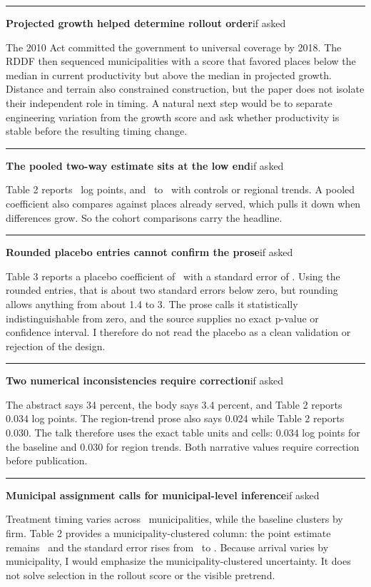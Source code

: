 \documentclass[11pt]{article}
\newcommand{\scriptframe}[3]{%
  \Needspace{11\baselineskip}%
  \par\medskip\noindent\textcolor{ScriptBlue}{\rule{\linewidth}{0.55pt}}%
  \par\smallskip\noindent
  \textbf{#1}\hfill\textcolor{ScriptGray}{\small #2}\par\smallskip
  #3\par}
\begin{document}
\scriptframe{Projected growth helped determine rollout order}{if asked}{%
  The 2010 Act committed the government to universal coverage by 2018. The RDDF
  then sequenced municipalities with a score that favored places below the
  median in current productivity but above the median in projected growth.
  Distance and terrain also constrained construction, but the paper does not
  isolate their independent role in timing. A natural next step would be to
  separate engineering variation from the growth score and ask whether
  productivity is stable before the resulting timing change.
}

\scriptframe{The pooled two-way estimate sits at the low end}{if asked}{%
  Table 2 reports \ResBaseline\ log points, and \ResTrends\ to \ResControls\
  with controls or regional trends. A pooled coefficient also compares against
  places already served, which pulls it down when differences grow. So the
  cohort comparisons carry the headline.
}

\scriptframe{Rounded placebo entries cannot confirm the prose}{if asked}{%
  Table 3 reports a placebo coefficient of \ResPlacebo\ with a standard error
  of \ResPlaceboSE. Using the rounded entries, that is about two standard
  errors below zero, but rounding allows anything from about 1.4 to 3. The
  prose calls it statistically indistinguishable from zero, and the source
  supplies no exact p-value or confidence interval. I therefore do not read the placebo as a clean
  validation or rejection of the design.
}

\scriptframe{Two numerical inconsistencies require correction}{if asked}{%
  The abstract says 34 percent, the body says 3.4 percent, and Table 2 reports
  0.034 log points. The region-trend prose also says 0.024 while Table 2 reports
  0.030. The talk therefore uses the exact table units and cells: 0.034 log
  points for the baseline and 0.030 for region trends. Both narrative values
  require correction before publication.
}

\scriptframe{Municipal assignment calls for municipal-level inference}{if asked}{%
  Treatment timing varies across \ResMunicipalities\ municipalities, while the
  baseline clusters by firm. Table 2 provides a municipality-clustered column:
  the point estimate remains \ResMunicipalCluster\ and the standard error rises
  from \ResBaselineSE\ to \ResMunicipalClusterSE. Because arrival varies by
  municipality, I would emphasize the municipality-clustered uncertainty. It
  does not solve selection in the rollout score or the visible pretrend.
}
\end{document}
